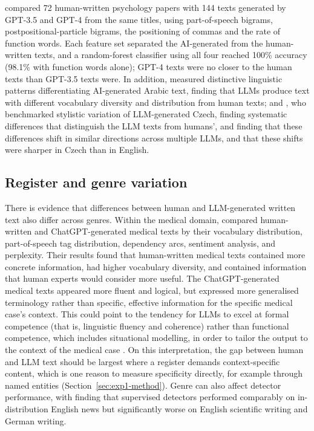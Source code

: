 \documentclass[thesis]{cluu}
\begin{document}
\textcite{zaitsu2023distinguishing} compared 72 human-written psychology papers with 144 texts generated by GPT-3.5 and GPT-4 from the same titles, using part-of-speech bigrams, postpositional-particle bigrams, the positioning of commas and the rate of function words. Each feature set separated the AI-generated from the human-written texts, and a random-forest classifier using all four reached 100\% accuracy (98.1\% with function words alone); GPT-4 texts were no closer to the human texts than GPT-3.5 texts were. In addition, \textcite{alshaibani2025arabicaifingerprintstylometric} measured distinctive linguistic patterns differentiating AI-generated Arabic text, finding that LLMs
produce text with different vocabulary diversity and distribution from human texts; and \textcite{milicka2024benchmark}, who benchmarked stylistic variation of LLM-generated Czech, finding systematic differences that distinguish the LLM texts from humans', and finding that these differences shift in similar directions across multiple LLMs, and that these shifts were sharper in Czech than in English. 


\subsection{Register and genre variation}
There is evidence that differences between human and LLM-generated written text also differ across genres. Within the medical domain,  \textcite{liao2023differentiating} compared
human-written and ChatGPT-generated medical texts by their vocabulary
distribution, part-of-speech tag distribution, dependency arcs,
sentiment analysis, and perplexity. Their results found that human-written medical texts contained more concrete information, had higher
vocabulary diversity, and contained information that human
experts would consider more useful. The ChatGPT-generated
medical texts appeared more fluent and logical, but expressed
more generalised terminology rather than specific, effective
information for the specific medical case's context. This could point to the tendency for LLMs to excel at formal competence (that is, linguistic fluency and coherence) rather than functional competence, which includes situational modelling, in order to tailor the output to the context of the medical case \parencite{mahowald2024dissociating}. On this interpretation, the gap between human and LLM text should be largest where a register demands context-specific content, which is one reason to measure specificity directly, for example through named entities (Section~\ref{sec:exp1-method}). Genre can also affect detector performance, with \textcite{bao2024fastdetectgpt} finding that supervised detectors performed comparably on in-distribution English news but significantly worse on English scientific writing and German writing.
\end{document}

